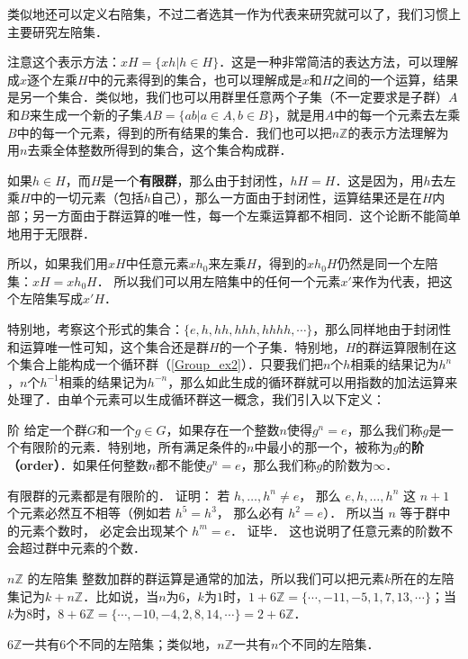 类似地还可以定义右陪集，不过二者选其一作为代表来研究就可以了，我们习惯上主要研究左陪集．

注意这个表示方法：$xH=\{xh|h\in H\}$．这是一种非常简洁的表达方法，可以理解成$x$逐个左乘$H$中的元素得到的集合，也可以理解成是$x$和$H$之间的一个运算，结果是另一个集合．类似地，我们也可以用群里任意两个子集（不一定要求是子群）$A$和$B$来生成一个新的子集$AB=\{ab|a\in A, b\in B\}$，就是用$A$中的每一个元素去左乘$B$中的每一个元素，得到的所有结果的集合．我们也可以把$n\mathbb{Z}$的表示方法理解为用$n$去乘全体整数所得到的集合，这个集合构成群．

如果$h\in H$，而$H$是一个\textbf{有限群}，那么由于封闭性，$hH=H$．这是因为，用$h$去左乘$H$中的一切元素（包括$h$自己），那么一方面由于封闭性，运算结果还是在$H$内部；另一方面由于群运算的唯一性，每一个左乘运算都不相同．这个论断不能简单地用于无限群．

所以，如果我们用$xH$中任意元素$xh_0$来左乘$H$，得到的$xh_0H$仍然是同一个左陪集：$xH=xh_0H$． 所以我们可以用左陪集中的任何一个元素$x'$来作为代表，把这个左陪集写成$x'H$．

特别地，考察这个形式的集合：$\{e, h, hh, hhh, hhhh, \cdots\}$，那么同样地由于封闭性和运算唯一性可知，这个集合还是群$H$的一个子集．特别地，$H$的群运算限制在这个集合上能构成一个循环群（\autoref{Group_ex2}）．只要我们把$n$个$h$相乘的结果记为$h^n$，$n$个$h^{-1}$相乘的结果记为$h^{-n}$，那么如此生成的循环群就可以用指数的加法运算来处理了．由单个元素可以生成循环群这一概念，我们引入以下定义：

\begin{definition}{阶}
给定一个群$G$和一个$g\in G$，如果存在一个整数$n$使得$g^n=e$，那么我们称$g$是一个有限阶的元素．特别地，所有满足条件的$n$中最小的那一个，被称为$g$的\textbf{阶（order）}．如果任何整数$n$都不能使$g^n=e$，那么我们称$g$的阶数为$\infty$．
\end{definition}

有限群的元素都是有限阶的． 证明： 若 $h, \dots, h^{n} \ne e$， 那么 $e, h, \dots, h^{n}$ 这 $n+1$ 个元素必然互不相等（例如若 $h^5 = h^3$， 那么必有 $h^2 = e$）． 所以当 $n$ 等于群中的元素个数时， 必定会出现某个 $h^m = e$． 证毕． 这也说明了任意元素的阶数不会超过群中元素的个数．

\begin{example}{$n\mathbb{Z}$ 的左陪集}\label{Group1_ex2}
整数加群的群运算是通常的加法，所以我们可以把元素$k$所在的左陪集记为$k+n\mathbb{Z}$．比如说，当$n$为$6$，$k$为$1$时，$1+6\mathbb{Z}=\{\cdots, -11, -5, 1, 7, 13, \cdots\}$；当$k$为$8$时，$8+6\mathbb{Z}=\{\cdots, -10, -4, 2, 8, 14, \cdots\}=2+6\mathbb{Z}$．

$6\mathbb{Z}$一共有$6$个不同的左陪集；类似地，$n\mathbb{Z}$一共有$n$个不同的左陪集．


\end{example}

